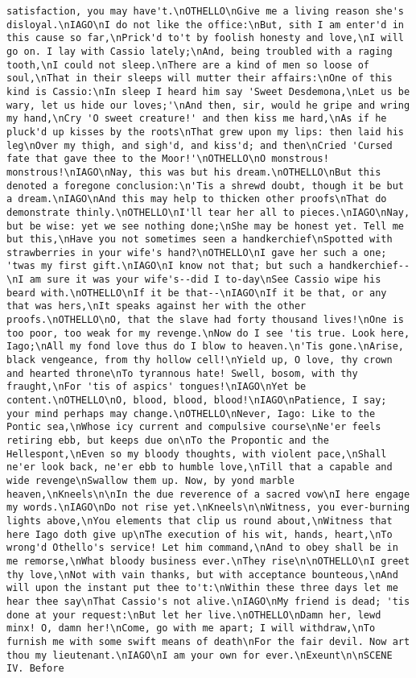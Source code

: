 \begin{verbatim}
satisfaction, you may have't.\nOTHELLO\nGive me a living reason she's disloyal.\nIAGO\nI do not like the office:\nBut, sith I am enter'd in this cause so far,\nPrick'd to't by foolish honesty and love,\nI will go on. I lay with Cassio lately;\nAnd, being troubled with a raging tooth,\nI could not sleep.\nThere are a kind of men so loose of soul,\nThat in their sleeps will mutter their affairs:\nOne of this kind is Cassio:\nIn sleep I heard him say 'Sweet Desdemona,\nLet us be wary, let us hide our loves;'\nAnd then, sir, would he gripe and wring my hand,\nCry 'O sweet creature!' and then kiss me hard,\nAs if he pluck'd up kisses by the roots\nThat grew upon my lips: then laid his leg\nOver my thigh, and sigh'd, and kiss'd; and then\nCried 'Cursed fate that gave thee to the Moor!'\nOTHELLO\nO monstrous! monstrous!\nIAGO\nNay, this was but his dream.\nOTHELLO\nBut this denoted a foregone conclusion:\n'Tis a shrewd doubt, though it be but a dream.\nIAGO\nAnd this may help to thicken other proofs\nThat do demonstrate thinly.\nOTHELLO\nI'll tear her all to pieces.\nIAGO\nNay, but be wise: yet we see nothing done;\nShe may be honest yet. Tell me but this,\nHave you not sometimes seen a handkerchief\nSpotted with strawberries in your wife's hand?\nOTHELLO\nI gave her such a one; 'twas my first gift.\nIAGO\nI know not that; but such a handkerchief--\nI am sure it was your wife's--did I to-day\nSee Cassio wipe his beard with.\nOTHELLO\nIf it be that--\nIAGO\nIf it be that, or any that was hers,\nIt speaks against her with the other proofs.\nOTHELLO\nO, that the slave had forty thousand lives!\nOne is too poor, too weak for my revenge.\nNow do I see 'tis true. Look here, Iago;\nAll my fond love thus do I blow to heaven.\n'Tis gone.\nArise, black vengeance, from thy hollow cell!\nYield up, O love, thy crown and hearted throne\nTo tyrannous hate! Swell, bosom, with thy fraught,\nFor 'tis of aspics' tongues!\nIAGO\nYet be content.\nOTHELLO\nO, blood, blood, blood!\nIAGO\nPatience, I say; your mind perhaps may change.\nOTHELLO\nNever, Iago: Like to the Pontic sea,\nWhose icy current and compulsive course\nNe'er feels retiring ebb, but keeps due on\nTo the Propontic and the Hellespont,\nEven so my bloody thoughts, with violent pace,\nShall ne'er look back, ne'er ebb to humble love,\nTill that a capable and wide revenge\nSwallow them up. Now, by yond marble heaven,\nKneels\n\nIn the due reverence of a sacred vow\nI here engage my words.\nIAGO\nDo not rise yet.\nKneels\n\nWitness, you ever-burning lights above,\nYou elements that clip us round about,\nWitness that here Iago doth give up\nThe execution of his wit, hands, heart,\nTo wrong'd Othello's service! Let him command,\nAnd to obey shall be in me remorse,\nWhat bloody business ever.\nThey rise\n\nOTHELLO\nI greet thy love,\nNot with vain thanks, but with acceptance bounteous,\nAnd will upon the instant put thee to't:\nWithin these three days let me hear thee say\nThat Cassio's not alive.\nIAGO\nMy friend is dead; 'tis done at your request:\nBut let her live.\nOTHELLO\nDamn her, lewd minx! O, damn her!\nCome, go with me apart; I will withdraw,\nTo furnish me with some swift means of death\nFor the fair devil. Now art thou my lieutenant.\nIAGO\nI am your own for ever.\nExeunt\n\nSCENE IV. Before 
\end{verbatim}

